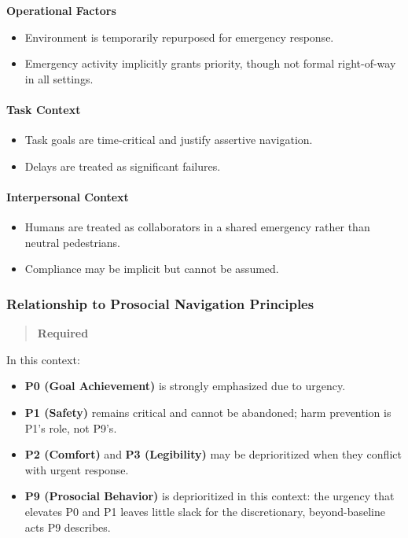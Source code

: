 \documentclass[utf8]{frontiers_suppmat} %
\providecommand{\tightlist}{%
  \setlength{\itemsep}{0pt}\setlength{\parskip}{0pt}}
\begin{document}
\textbf{Operational Factors}

\begin{itemize}
\tightlist
\item
  Environment is temporarily repurposed for emergency response.
\item
  Emergency activity implicitly grants priority, though not formal
  right-of-way in all settings.
\end{itemize}

\paragraph{Task Context}\label{task-context}

\begin{itemize}
\tightlist
\item
  Task goals are time-critical and justify assertive navigation.
\item
  Delays are treated as significant failures.
\end{itemize}

\paragraph{Interpersonal Context}\label{interpersonal-context}

\begin{itemize}
\tightlist
\item
  Humans are treated as collaborators in a shared emergency rather than
  neutral pedestrians.
\item
  Compliance may be implicit but cannot be assumed.
\end{itemize}

\subsubsection{Relationship to Prosocial Navigation
Principles}\label{relationship-to-prosocial-navigation-principles}

\begin{quote}
\textbf{Required}
\end{quote}

In this context:

\begin{itemize}
\tightlist
\item
  \textbf{P0 (Goal Achievement)} is strongly emphasized due to urgency.
\item
  \textbf{P1 (Safety)} remains critical and cannot be abandoned; harm
  prevention is P1's role, not P9's.
\item
  \textbf{P2 (Comfort)} and \textbf{P3 (Legibility)} may be
  deprioritized when they conflict with urgent response.
\item
  \textbf{P9 (Prosocial Behavior)} is deprioritized in this context: the
  urgency that elevates P0 and P1 leaves little slack for the
  discretionary, beyond-baseline acts P9 describes.
\end{itemize}
\end{document}

